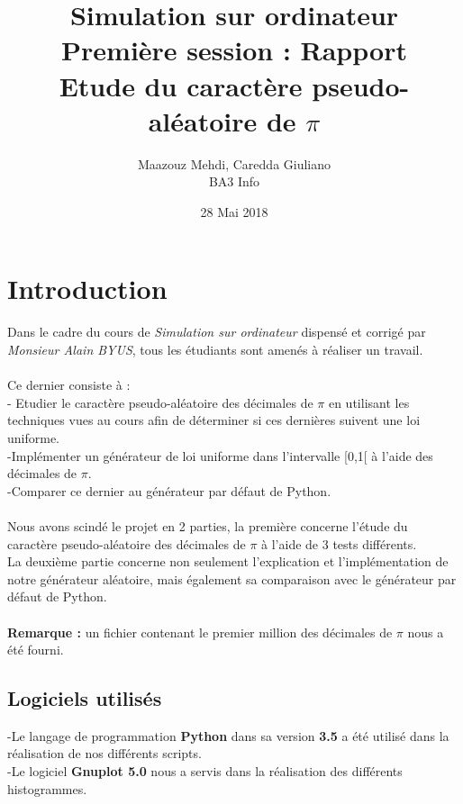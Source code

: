 \documentclass[french]{article}
\title{Simulation sur ordinateur \\ Première session : Rapport \\ Etude du caractère pseudo-aléatoire de $\pi$}
\author{Maazouz Mehdi, Caredda Giuliano \\ BA3 Info}
\date{28 Mai 2018}
\begin{document}
\maketitle
\newpage
\renewcommand{\contentsname}{Sommaire}
\tableofcontents
\newpage

\section{Introduction}
Dans le cadre du cours de \textit{Simulation sur ordinateur} dispensé et corrigé par \textit{Monsieur Alain BYUS}, tous les étudiants sont amenés à réaliser un travail.
\\
\\
Ce dernier consiste à : 
\\

     - Etudier le caractère pseudo-aléatoire des décimales de $\pi$ en utilisant les techniques vues au cours afin de déterminer si ces dernières suivent une loi uniforme.
     \\
     
     -Implémenter un générateur de loi uniforme dans l'intervalle [0,1[ à l'aide des décimales de $\pi$.
     \\
     
     -Comparer ce dernier au générateur par défaut de Python.
\\
\\
Nous avons scindé le projet en 2 parties, la première concerne l'étude du caractère pseudo-aléatoire des décimales
de $\pi$ à l'aide de 3 tests différents.
\\
La deuxième partie concerne non seulement l'explication et l'implémentation de notre générateur aléatoire, mais également sa comparaison avec le générateur par défaut de Python.
\\
\\
\textbf{Remarque :} un fichier contenant le premier million des décimales de $\pi$ nous a été fourni.

\subsection{Logiciels utilisés}
-Le langage de programmation \textbf{Python} dans sa version \textbf{3.5} a été utilisé dans la réalisation de nos différents scripts.
\\

-Le logiciel \textbf{Gnuplot 5.0} nous a servis dans la réalisation des différents histogrammes.
\\
\end{document}
